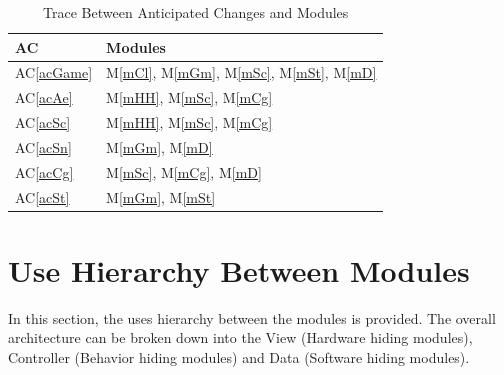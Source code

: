 \documentclass[12pt, titlepage]{article}
\newcommand{\acref}[1]{AC\ref{#1}}
\newcommand{\mref}[1]{M\ref{#1}}
\begin{document}
\begin{table}[!htbp]
\centering
\begin{tabular}{p{} p{}}
\toprule
\textbf{AC} & \textbf{Modules}\\
\midrule
\acref{acGame} & \mref{mCl}, \mref{mGm}, \mref{mSc}, \mref{mSt}, \mref{mD} \\
\acref{acAe} & \mref{mHH}, \mref{mSc}, \mref{mCg}\\
\acref{acSc} & \mref{mHH}, \mref{mSc}, \mref{mCg}\\
\acref{acSn} & \mref{mGm}, \mref{mD} \\
\acref{acCg} & \mref{mSc},  \mref{mCg}, \mref{mD}\\
\acref{acSt} & \mref{mGm}, \mref{mSt} \\
\bottomrule
\end{tabular}
\caption{Trace Between Anticipated Changes and Modules}
\label{TblACT}
\end{table}

\section{Use Hierarchy Between Modules} \label{SecUse}


In this section, the uses hierarchy between the modules is provided. The overall architecture can be broken down into the View (Hardware hiding modules), Controller (Behavior hiding modules) and Data (Software hiding modules). \\

\bigskip
\end{document}
